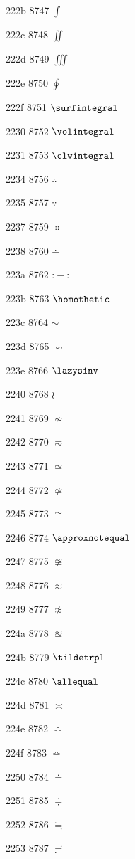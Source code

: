\documentclass[11pt]{article}
\begin{document}
222b 8747 \ensuremath{\int}

222c 8748 \ensuremath{\iint}

222d 8749 \ensuremath{\iiint}

222e 8750 \ensuremath{\oint}

222f 8751 \ensuremath{\surfintegral}

2230 8752 \ensuremath{\volintegral}

2231 8753 \ensuremath{\clwintegral}

2234 8756 \ensuremath{\therefore}

2235 8757 \ensuremath{\because}

2237 8759 \ensuremath{\Colon}

2238 8760 \ensuremath{\dotminus}

223a 8762 \ensuremath{\mathbin{:}\!\!{-}\!\!{:}}

223b 8763 \ensuremath{\homothetic}

223c 8764 \ensuremath{\sim}

223d 8765 \ensuremath{\backsim}

223e 8766 \ensuremath{\lazysinv}

2240 8768 \ensuremath{\wr}

2241 8769 \ensuremath{\nsim}

2242 8770 \ensuremath{\eqsim}

2243 8771 \ensuremath{\simeq}

2244 8772 \ensuremath{\nsime}

2245 8773 \ensuremath{\cong}

2246 8774 \ensuremath{\approxnotequal}

2247 8775 \ensuremath{\ncong}

2248 8776 \ensuremath{\approx}

2249 8777 \ensuremath{\napprox}

224a 8778 \ensuremath{\approxeq}

224b 8779 \ensuremath{\tildetrpl}

224c 8780 \ensuremath{\allequal}

224d 8781 \ensuremath{\asymp}

224e 8782 \ensuremath{\Bumpeq}

224f 8783 \ensuremath{\bumpeq}

2250 8784 \ensuremath{\doteq}

2251 8785 \ensuremath{\doteqdot}

2252 8786 \ensuremath{\fallingdotseq}

2253 8787 \ensuremath{\risingdotseq}
\end{document}
